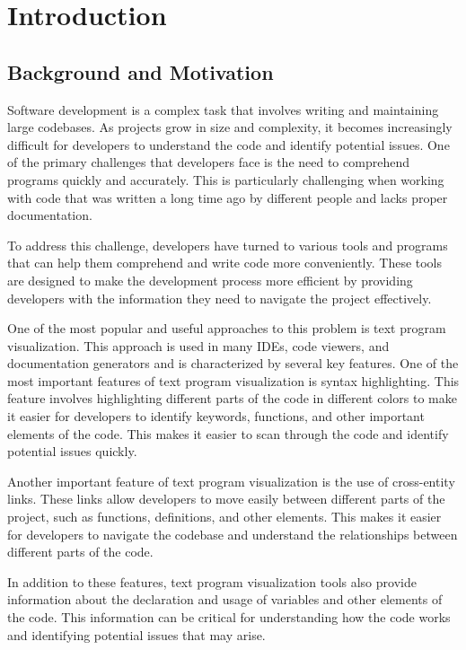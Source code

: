 \chapter{Introduction}
\label{chap:intro}

\section{Background and Motivation}

Software development is a complex task that involves writing and maintaining large codebases. As projects grow in size and complexity, it becomes increasingly difficult for developers to understand the code and identify potential issues. One of the primary challenges that developers face is the need to comprehend programs quickly and accurately. This is particularly challenging when working with code that was written a long time ago by different people and lacks proper documentation.

To address this challenge, developers have turned to various tools and programs that can help them comprehend and write code more conveniently. These tools are designed to make the development process more efficient by providing developers with the information they need to navigate the project effectively.

One of the most popular and useful approaches to this problem is text program visualization. This approach is used in many IDEs, code viewers, and documentation generators and is characterized by several key features. One of the most important features of text program visualization is syntax highlighting. This feature involves highlighting different parts of the code in different colors to make it easier for developers to identify keywords, functions, and other important elements of the code. This makes it easier to scan through the code and identify potential issues quickly.

Another important feature of text program visualization is the use of cross-entity links. These links allow developers to move easily between different parts of the project, such as functions, definitions, and other elements. This makes it easier for developers to navigate the codebase and understand the relationships between different parts of the code.

In addition to these features, text program visualization tools also provide information about the declaration and usage of variables and other elements of the code. This information can be critical for understanding how the code works and identifying potential issues that may arise.

